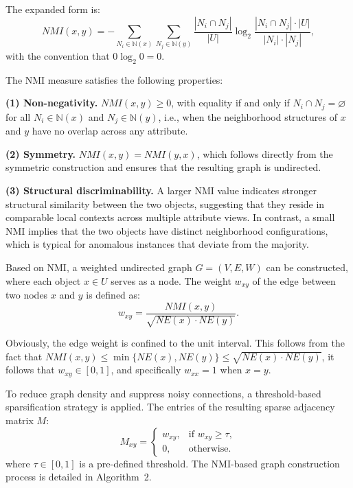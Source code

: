 \documentclass[lettersize,journal]{IEEEtran}
\begin{document}
The expanded form is:
\begin{equation}
NMI(x, y) = -\sum_{N_{i} \in \mathbb{N}(x)} \sum_{N_{j} \in \mathbb{N}(y)}
            \frac{|N_{i} \cap N_{j}|}{|U|}
            \log_{2} \frac{|N_{i} \cap N_{j}| \cdot |U|}{|N_{i}| \cdot |N_{j}|},
\end{equation}
with the convention that \(0 \log_{2} 0 = 0\).

The NMI measure satisfies the following properties:

\noindent \textbf{(1) Non-negativity.} \(NMI(x, y) \geq 0\), with equality if and only if
\(N_{i} \cap N_{j} = \varnothing\) for all \(N_{i} \in \mathbb{N}(x)\) and
\(N_{j} \in \mathbb{N}(y)\), i.e., when the neighborhood structures of \(x\) and \(y\) have no overlap
across any attribute.

\noindent \textbf{(2) Symmetry.} \(NMI(x, y) = NMI(y, x)\), which follows directly from the symmetric
construction and ensures that the resulting graph is undirected.

\noindent \textbf{(3) Structural discriminability.} A larger NMI value indicates stronger structural
similarity between the two objects, suggesting that they reside in comparable local contexts across
multiple attribute views. In contrast, a small NMI implies that the two objects have distinct
neighborhood configurations, which is typical for anomalous instances that deviate from the majority.

Based on NMI, a weighted undirected graph \(G = (V, E, W)\) can be constructed, where each object
\(x \in U\) serves as a node. The weight \(w_{xy}\) of the edge between two nodes \(x\) and \(y\) is
defined as:
\begin{equation}
w_{xy} = \frac{NMI(x, y)}{\sqrt{NE(x) \cdot NE(y)}}.
\end{equation}

Obviously, the edge weight is confined to the unit interval. This follows from the fact that
\(NMI(x, y) \leq \min\{NE(x), NE(y)\} \leq \sqrt{NE(x) \cdot NE(y)}\), it follows that
\(w_{xy} \in [0, 1]\), and specifically \(w_{xx} = 1\) when \(x = y\).

To reduce graph density and suppress noisy connections, a threshold-based sparsification strategy is
applied. The entries of the resulting sparse adjacency matrix \(M\):
\begin{equation}
M_{xy} = \begin{cases}
w_{xy}, & \text{if } w_{xy} \geq \tau, \\
0, & \text{otherwise}.
\end{cases}
\end{equation}
where \(\tau \in [0, 1]\) is a pre-defined threshold. The NMI-based graph construction process is
detailed in Algorithm~2.
\end{document}
